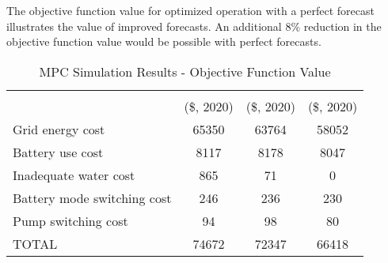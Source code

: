 The objective function value for optimized operation with a perfect forecast illustrates the value of improved forecasts.
An additional 8\% reduction in the objective function value would be possible with perfect forecasts.

\begin{table}
	\caption{MPC Simulation Results - Objective Function Value}
	\label{table:mpc-simulation-results}
	\centering
	\begin{tabular}{lS[table-format=5]S[table-format=5]S[table-format=5]}
		\toprule
          & {} & {} & {} \\
		  & {(\$, 2020)} & {(\$, 2020)}                    & {(\$, 2020)} \\
		\midrule
		Grid energy cost            & 65350 & 63764 & 58052 \\
		Battery use cost            &  8117 &  8178 &  8047 \\
		Inadequate water cost       &   865 &    71 &     0 \\
		Battery mode switching cost &   246 &   236 &   230 \\
		Pump switching cost         &    94 &    98 &    80 \\
		\midrule
		TOTAL                       & 74672 & 72347 & 66418 \\
		\bottomrule
	\end{tabular}
\end{table}

